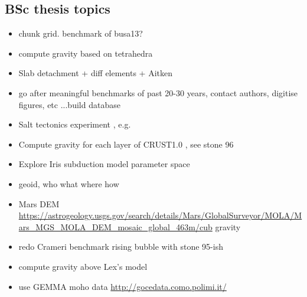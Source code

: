 \subsection{BSc thesis topics}
\begin{itemize} 
\item chunk grid. benchmark of busa13?
\item compute gravity based on tetrahedra
\item Slab detachment + diff elements + Aitken
\item go after meaningful benchmarks of past 20-30 years, contact authors, digitise figures, etc ...build database
\item Salt tectonics experiment , e.g. \cite{bers72} 
\item Compute gravity for each layer of CRUST1.0 , see stone 96
\item Explore Iris subduction model parameter space
\item geoid, who what where how
\item Mars DEM \url{https://astrogeology.usgs.gov/search/details/Mars/GlobalSurveyor/MOLA/Mars_MGS_MOLA_DEM_mosaic_global_463m/cub} gravity
\item redo Crameri benchmark rising bubble with stone 95-ish
\item compute gravity above Lex's model \cite{furc15}
\item use GEMMA moho data \url{http://gocedata.como.polimi.it/} \cite{resa15} 
\end{itemize}

